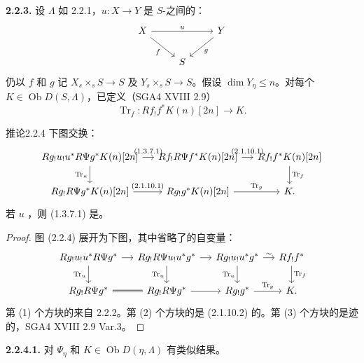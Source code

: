 \textbf{2.2.3.} 设 $\Lambda$ 如 2.2.1，$u:X\to Y$ 是 $S$-之间的：
\[\begin{tikzcd}X\arrow[rr,"u"]\arrow[dr,"f"']&&Y\arrow[dl,"g"]\\&S&\end{tikzcd}\]
仍以 $f$ 和 $g$ 记 $X_s\times_sS\to S$ 及 $Y_s\times_sS\to S$。假设 $\dim Y_\eta\le n$。对每个 $K\in\operatorname{Ob}D(S,\Lambda)$，已定义（SGA4 XVIII 2.9）
\[\operatorname{Tr}_f:Rf_!f^*K(n)[2n]\longrightarrow K.\]
\begin{SGAresult}{推论}{2.2.4}
下图交换：
\[
\begin{tikzcd}[column sep=small]
Rg_!u_!u^*R\Psi g^*K(n)[2n]\arrow[r,"(1.3.7.1)"]\arrow[d,"\operatorname{Tr}_u"']&Rf_!R\Psi f^*K(n)[2n]\arrow[r,"(2.1.10.1)"]&Rf_!f^*K(n)[2n]\arrow[d,"\operatorname{Tr}_f"]\\
Rg_!R\Psi g^*K(n)[2n]\arrow[r,"(2.1.10.1)"]&Rg_!g^*K(n)[2n]\arrow[r,"\operatorname{Tr}_g"]&K.
\end{tikzcd}
\]
若 $u$ ，则 (1.3.7.1) 是。
\end{SGAresult}
\begin{proof}
图 (2.2.4) 展开为下图，其中省略了的自变量：
\[
\begin{tikzcd}[column sep=small]
Rg_!u_!u^*R\Psi g^*\arrow[r]\arrow[d,"\operatorname{Tr}_u"']&Rg_!R\Psi u_!u^*g^*\arrow[r]\arrow[d,"\operatorname{Tr}_u"']&Rg_!u_!u^*g^*\arrow[r,"\sim"]\arrow[d,"\operatorname{Tr}_u"']&Rf_!f^*\arrow[d,"\operatorname{Tr}_f"]\\
Rg_!R\Psi g^*\arrow[r,equal]&Rg_!R\Psi g^*\arrow[r]&Rg_!g^*\arrow[r,"\operatorname{Tr}_g"]&K.
\end{tikzcd}
\]
第 (1) 个方块的来自 2.2.2。第 (2) 个方块的是
(2.1.10.2) 的。第 (3) 个方块的是迹的，SGA4 XVIII 2.9 Var.3。
\end{proof}
\textbf{2.2.4.1.} 对 $\Psi_\eta$ 和 $K\in\operatorname{Ob}D(\eta,\Lambda)$ 有类似结果。

